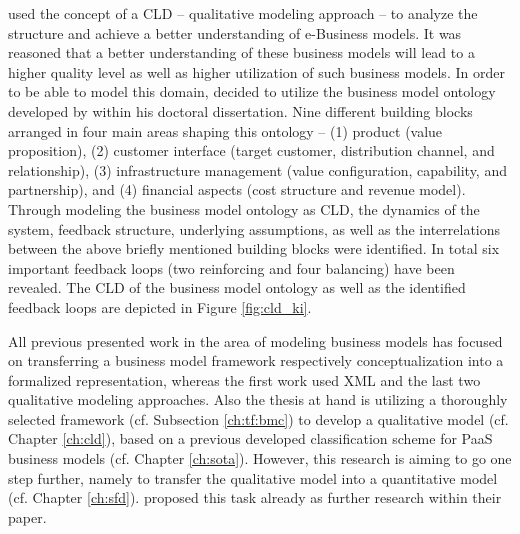 \citet{Kiani2009} used the concept of a \ac{CLD} -- qualitative modeling approach -- to analyze the structure and achieve a better understanding of e-Business models. It was reasoned that a better understanding of these business models will lead to a higher quality level as well as higher utilization of such business models. In order to be able to model this domain, \citet{Kiani2009} decided to utilize the business model ontology developed by \citet{Osterwalder2004} within his doctoral dissertation. Nine different building blocks arranged in four main areas shaping this ontology -- (1) product (value proposition), (2) customer interface (target customer, distribution channel, and relationship), (3) infrastructure management (value configuration, capability, and partnership), and (4) financial aspects (cost structure and revenue model). Through modeling the business model ontology as \ac{CLD}, the dynamics of the system, feedback structure, underlying assumptions, as well as the interrelations between the above briefly mentioned building blocks were identified. In total six important feedback loops (two reinforcing and four balancing) have been revealed. The \ac{CLD} of the business model ontology as well as the identified feedback loops are depicted in Figure \ref{fig:cld_ki}.

All previous presented work in the area of modeling business models has focused on transferring a business model framework respectively conceptualization into a formalized representation, whereas the first work used \ac{XML} and the last two qualitative modeling approaches. Also the thesis at hand is utilizing a thoroughly selected framework (cf. Subsection \ref{ch:tf:bmc}) to develop a qualitative model (cf. Chapter \ref{ch:cld}), based on a previous developed classification scheme for \ac{PaaS} business models (cf. Chapter \ref{ch:sota}). However, this research is aiming to go one step further, namely to transfer the qualitative model into a quantitative model (cf. Chapter \ref{ch:sfd}). \citet{Kiani2009} proposed this task already as further research within their paper.